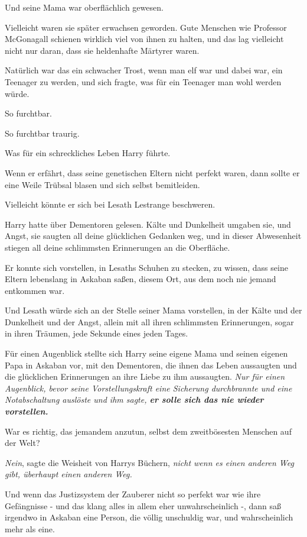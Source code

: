 Und seine Mama war oberflächlich gewesen.

Vielleicht waren sie später erwachsen geworden. Gute Menschen wie Professor
McGonagall schienen wirklich viel von ihnen zu halten, und das lag vielleicht
nicht nur daran, dass sie heldenhafte Märtyrer waren.

Natürlich war das ein schwacher Trost, wenn man elf war und dabei war, ein
Teenager zu werden, und sich fragte, was für ein Teenager man wohl werden würde.

So furchtbar.

So furchtbar traurig.

Was für ein schreckliches Leben Harry führte.

Wenn er erfährt, dass seine genetischen Eltern nicht perfekt waren, dann sollte
er eine Weile Trübsal blasen und sich selbst bemitleiden.

Vielleicht könnte er sich bei Lesath Lestrange beschweren.

Harry hatte über Dementoren gelesen. Kälte und Dunkelheit umgaben sie, und
Angst, sie saugten all deine glücklichen Gedanken weg, und in dieser Abwesenheit
stiegen all deine schlimmsten Erinnerungen an die Oberfläche.

Er konnte sich vorstellen, in Lesaths Schuhen zu stecken, zu wissen, dass seine
Eltern lebenslang in Askaban saßen, diesem Ort, aus dem noch nie jemand
entkommen war.

Und Lesath würde sich an der Stelle seiner Mama vorstellen, in der Kälte und
der Dunkelheit und der Angst, allein mit all ihren schlimmsten Erinnerungen,
sogar in ihren Träumen, jede Sekunde eines jeden Tages.

Für einen Augenblick stellte sich Harry seine eigene Mama und seinen eigenen
Papa in Askaban vor, mit den Dementoren, die ihnen das Leben aussaugten und die
glücklichen Erinnerungen an ihre Liebe zu ihm aussaugten. \emph{Nur für einen
Augenblick, bevor seine Vorstellungskraft eine Sicherung durchbrannte und eine
Notabschaltung auslöste und ihm sagte, \textbf{er solle sich das nie wieder
vorstellen.}}

War es richtig, das jemandem anzutun, selbst dem zweitbösesten Menschen auf der
Welt?

\emph{Nein}, sagte die Weisheit von Harrys Büchern, \emph{nicht wenn es einen
anderen Weg gibt, überhaupt einen anderen Weg.}

Und wenn das Justizsystem der Zauberer nicht so perfekt war wie ihre Gefängnisse
- und das klang alles in allem eher unwahrscheinlich -, dann saß irgendwo in
Askaban eine Person, die völlig unschuldig war, und wahrscheinlich mehr als
eine.

